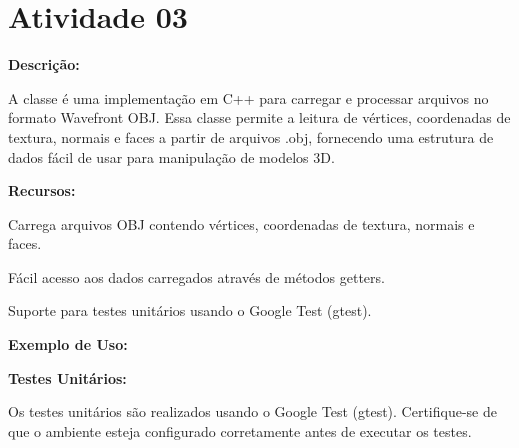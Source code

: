 \chapter{Atividade 03}
\hypertarget{index}{}\label{index}
\label{index_md__2_users_2renanoliveira_2_desktop_2ufscar_2_faculdade_2_computacao_01_grafica_22023_2_atividade03_2_r_e_a_d_m_e}%
%
 {\bfseries{Descrição\+:}}

A classe {\ttfamily {}} é uma implementação em C++ para carregar e processar arquivos no formato Wavefront OBJ. Essa classe permite a leitura de vértices, coordenadas de textura, normais e faces a partir de arquivos {\ttfamily .obj}, fornecendo uma estrutura de dados fácil de usar para manipulação de modelos 3D.

{\bfseries{Recursos\+:}}


\begin{DoxyItemize}
\item Carrega arquivos OBJ contendo vértices, coordenadas de textura, normais e faces.
\item Fácil acesso aos dados carregados através de métodos getters.
\item Suporte para testes unitários usando o Google Test (gtest).
\end{DoxyItemize}

{\bfseries{Exemplo de Uso\+:}}


\begin{DoxyCode}{0}

\end{DoxyCode}


{\bfseries{Testes Unitários\+:}}

Os testes unitários são realizados usando o Google Test (gtest). Certifique-\/se de que o ambiente esteja configurado corretamente antes de executar os testes.


\begin{DoxyCode}{0}

\end{DoxyCode}
 